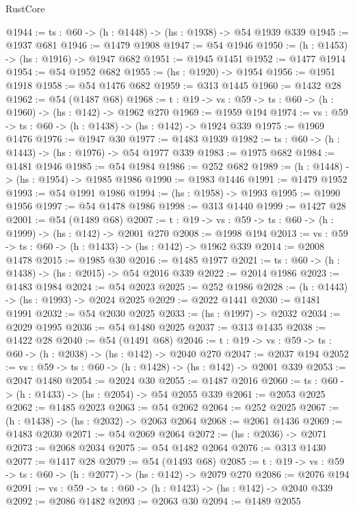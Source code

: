 \begin{lexlean}{RustCore}
\begin{coremodule}
@1944 := {ts : @60} -> (h : @1448) -> (hs : @1938) -> @54 @1939 @339
@1945 := @1937 @681
@1946 := @1479 @1908
@1947 := @54 @1946
@1950 := (h : @1453) -> (hs : @1916) -> @1947 @682
@1951 := @1945 @1451
@1952 := @1477 @1914
@1954 := @54 @1952 @682
@1955 := (hs : @1920) -> @1954
@1956 := @1951 @1918
@1958 := @54 @1476 @682
@1959 := @313 @1445
@1960 := @1432 @28
@1962 := @54 (@1487 @68)
@1968 := {t : @19} -> {vs : @59} -> {ts : @60} -> (h : @1960) -> (hs : @142) -> @1962 @270
@1969 := @1959 @194
@1974 := {vs : @59} -> {ts : @60} -> (h : @1438) -> (hs : @142) -> @1924 @339
@1975 := @1969 @1476
@1976 := @1947 @30
@1977 := @1483 @1939
@1982 := {ts : @60} -> (h : @1443) -> (hs : @1976) -> @54 @1977 @339
@1983 := @1975 @682
@1984 := @1481 @1946
@1985 := @54 @1984
@1986 := @252 @682
@1989 := (h : @1448) -> (hs : @1954) -> @1985 @1986
@1990 := @1983 @1446
@1991 := @1479 @1952
@1993 := @54 @1991 @1986
@1994 := (hs : @1958) -> @1993
@1995 := @1990 @1956
@1997 := @54 @1478 @1986
@1998 := @313 @1440
@1999 := @1427 @28
@2001 := @54 (@1489 @68)
@2007 := {t : @19} -> {vs : @59} -> {ts : @60} -> (h : @1999) -> (hs : @142) -> @2001 @270
@2008 := @1998 @194
@2013 := {vs : @59} -> {ts : @60} -> (h : @1433) -> (hs : @142) -> @1962 @339
@2014 := @2008 @1478
@2015 := @1985 @30
@2016 := @1485 @1977
@2021 := {ts : @60} -> (h : @1438) -> (hs : @2015) -> @54 @2016 @339
@2022 := @2014 @1986
@2023 := @1483 @1984
@2024 := @54 @2023
@2025 := @252 @1986
@2028 := (h : @1443) -> (hs : @1993) -> @2024 @2025
@2029 := @2022 @1441
@2030 := @1481 @1991
@2032 := @54 @2030 @2025
@2033 := (hs : @1997) -> @2032
@2034 := @2029 @1995
@2036 := @54 @1480 @2025
@2037 := @313 @1435
@2038 := @1422 @28
@2040 := @54 (@1491 @68)
@2046 := {t : @19} -> {vs : @59} -> {ts : @60} -> (h : @2038) -> (hs : @142) -> @2040 @270
@2047 := @2037 @194
@2052 := {vs : @59} -> {ts : @60} -> (h : @1428) -> (hs : @142) -> @2001 @339
@2053 := @2047 @1480
@2054 := @2024 @30
@2055 := @1487 @2016
@2060 := {ts : @60} -> (h : @1433) -> (hs : @2054) -> @54 @2055 @339
@2061 := @2053 @2025
@2062 := @1485 @2023
@2063 := @54 @2062
@2064 := @252 @2025
@2067 := (h : @1438) -> (hs : @2032) -> @2063 @2064
@2068 := @2061 @1436
@2069 := @1483 @2030
@2071 := @54 @2069 @2064
@2072 := (hs : @2036) -> @2071
@2073 := @2068 @2034
@2075 := @54 @1482 @2064
@2076 := @313 @1430
@2077 := @1417 @28
@2079 := @54 (@1493 @68)
@2085 := {t : @19} -> {vs : @59} -> {ts : @60} -> (h : @2077) -> (hs : @142) -> @2079 @270
@2086 := @2076 @194
@2091 := {vs : @59} -> {ts : @60} -> (h : @1423) -> (hs : @142) -> @2040 @339
@2092 := @2086 @1482
@2093 := @2063 @30
@2094 := @1489 @2055

\end{coremodule}
\end{lexlean}
